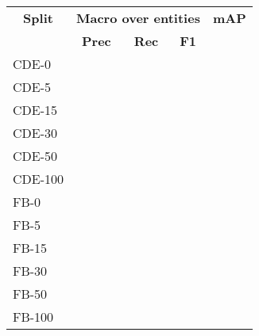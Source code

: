 \begin{tabular}{| l | r | r | r | r |}
    \hline

    \multicolumn{1}{|c|}{\textbf{Split}} &
    \multicolumn{3}{|c|}{\textbf{Macro over entities}} &
    \multicolumn{1}{|c|}{\textbf{mAP}} \\

    \multicolumn{1}{|c|}{} &
    \multicolumn{1}{|c|}{\textbf{Prec}} &
    \multicolumn{1}{|c|}{\textbf{Rec}} &
    \multicolumn{1}{|c|}{\textbf{F1}} &
    \multicolumn{1}{|c|}{} \\

    \hline \hline

    CDE-0   &  &  &  \\
    CDE-5   &  &  &  \\
    CDE-15  &  &  &  \\
    CDE-30  &  &  &  \\
    CDE-50  &  &  &  \\
    CDE-100 &  &  &  \\

    \hline

    FB-0    &  &  &  \\
    FB-5    &  &  &  \\
    FB-15   &  &  &  \\
    FB-30   &  &  &  \\
    FB-50   &  &  &  \\
    FB-100  &  &  &  \\

    \hline
\end{tabular}
